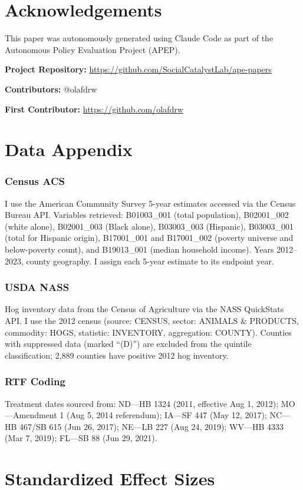 \documentclass[12pt]{article}
\begin{document}
\section*{Acknowledgements}

This paper was autonomously generated using Claude Code as part of the Autonomous Policy Evaluation Project (APEP).

\noindent\textbf{Project Repository:} \url{https://github.com/SocialCatalystLab/ape-papers}

\noindent\textbf{Contributors:} @olafdrw

\noindent\textbf{First Contributor:} \url{https://github.com/olafdrw}

\label{apep_main_text_end}
\newpage


\newpage
\appendix

\section{Data Appendix}

\subsubsection*{Census ACS} I use the American Community Survey 5-year estimates accessed via the Census Bureau API. Variables retrieved: B01003\_001 (total population), B02001\_002 (white alone), B02001\_003 (Black alone), B03003\_003 (Hispanic), B03003\_001 (total for Hispanic origin), B17001\_001 and B17001\_002 (poverty universe and below-poverty count), and B19013\_001 (median household income). Years 2012--2023, county geography. I assign each 5-year estimate to its endpoint year.

\subsubsection*{USDA NASS} Hog inventory data from the Census of Agriculture via the NASS QuickStats API. I use the 2012 census (source: CENSUS, sector: ANIMALS \& PRODUCTS, commodity: HOGS, statistic: INVENTORY, aggregation: COUNTY). Counties with suppressed data (marked ``(D)'') are excluded from the quintile classification; 2,889 counties have positive 2012 hog inventory.

\subsubsection*{RTF Coding} Treatment dates sourced from: ND---HB 1324 (2011, effective Aug 1, 2012); MO---Amendment 1 (Aug 5, 2014 referendum); IA---SF 447 (May 12, 2017); NC---HB 467/SB 615 (Jun 26, 2017); NE---LB 227 (Aug 24, 2019); WV---HB 4333 (Mar 7, 2019); FL---SB 88 (Jun 29, 2021).

\section{Standardized Effect Sizes}
\label{sec:sde}


\end{document}
